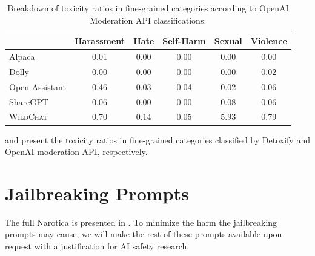 \documentclass{article} %
\newcommand{\corpus}{\textsc{WildChat}\xspace}
\begin{document}
\begin{table}[!htp]
\centering
\begin{tabular}{lccccc}
\toprule
                  & Harassment & Hate & Self-Harm & Sexual & Violence \\ \midrule
Alpaca            & 0.01       & 0.00    & 0.00         & 0.00      & 0.00\\
Dolly             & 0.00          & 0.00    & 0.00         & 0.00      & 0.02\\
Open Assistant    & 0.46       & 0.03 & 0.04      & 0.02   & 0.06 \\
ShareGPT          & 0.06       & 0.00    & 0.00         & 0.08   & 0.06\\
\corpus & 0.70        & 0.14 & 0.05      & 5.93   & 0.79 \\
\bottomrule
\end{tabular}
\caption{Breakdown of toxicity ratios in fine-grained categories according to OpenAI Moderation API classifications.}
\label{tab:openai-categories}
\end{table}

 and  present the toxicity ratios in fine-grained categories classified by Detoxify and OpenAI moderation API, respectively.

\section{\label{sec:jailbreak}Jailbreaking Prompts}
The full Narotica is presented in . To minimize the harm the jailbreaking prompts may cause, we will make the rest of these prompts available upon request with a justification for AI safety research.
\end{document}
